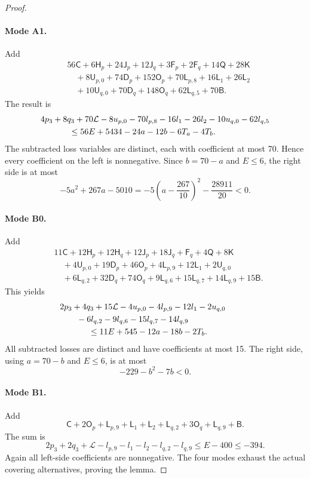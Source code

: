 \documentclass[11pt,a4paper]{article}
\theoremstyle{remark}
\begin{document}
\begin{proof}
\paragraph{Mode A1.}
Add
\begin{align*}
 &56\mathsf C+6\mathsf H_p+24\mathsf J_p+12\mathsf J_q
 +3\mathsf F_p+2\mathsf F_q+14\mathsf Q+28\mathsf K\\
 &\quad+8\mathsf U_{p,0}+74\mathsf D_p+152\mathsf O_p
 +70\mathsf L_{p,8}+16\mathsf L_1+26\mathsf L_2\\
 &\quad+10\mathsf U_{q,0}+70\mathsf D_q+148\mathsf O_q
 +62\mathsf L_{q,5}+70\mathsf B.
\end{align*}
The result is
\begin{align*}
 &4p_3+8q_3+70\mathcal L
 -8u_{p,0}-70l_{p,8}-16l_1-26l_2-10u_{q,0}-62l_{q,5}\\
 &\hspace{12mm}\le56E+5434-24a-12b-6T_a-4T_b.
\end{align*}
The subtracted loss variables are distinct, each with coefficient at
most 70. Hence every coefficient on the left is nonnegative. Since
$b=70-a$ and $E\le6$, the right side is at most
\[
 -5a^2+267a-5010
 =-5\left(a-\frac{267}{10}\right)^2-\frac{28911}{20}<0.
\]

\paragraph{Mode B0.}
Add
\begin{align*}
 &11\mathsf C+12\mathsf H_p+12\mathsf H_q+12\mathsf J_p
 +18\mathsf J_q+\mathsf F_q+4\mathsf Q+8\mathsf K\\
 &\quad+4\mathsf U_{p,0}+19\mathsf D_p+46\mathsf O_p
 +4\mathsf L_{p,9}+12\mathsf L_1+2\mathsf U_{q,0}\\
 &\quad+6\mathsf L_{q,2}+32\mathsf D_q+74\mathsf O_q
 +9\mathsf L_{q,6}+15\mathsf L_{q,7}+14\mathsf L_{q,9}
 +15\mathsf B.
\end{align*}
This yields
\begin{align*}
 &2p_3+4q_3+15\mathcal L
 -4u_{p,0}-4l_{p,9}-12l_1-2u_{q,0}\phantom{{}+11E}\\
 &\qquad-6l_{q,2}-9l_{q,6}-15l_{q,7}-14l_{q,9}\\
 &\hspace{12mm}\le11E+545-12a-18b-2T_b.
\end{align*}
All subtracted losses are distinct and have coefficients at most 15.
The right side, using $a=70-b$ and $E\le6$, is at most
\[
 -229-b^2-7b<0.
\]

\paragraph{Mode B1.}
Add
\[
 \mathsf C+2\mathsf O_p+\mathsf L_{p,9}+\mathsf L_1
 +\mathsf L_2+\mathsf L_{q,2}+3\mathsf O_q
 +\mathsf L_{q,9}+\mathsf B.
\]
The sum is
\[
 2p_3+2q_3+\mathcal L-l_{p,9}-l_1-l_2-l_{q,2}-l_{q,9}
 \le E-400\le-394.
\]
Again all left-side coefficients are nonnegative. The four modes exhaust
the actual covering alternatives, proving the lemma.
\end{proof}
\end{document}
